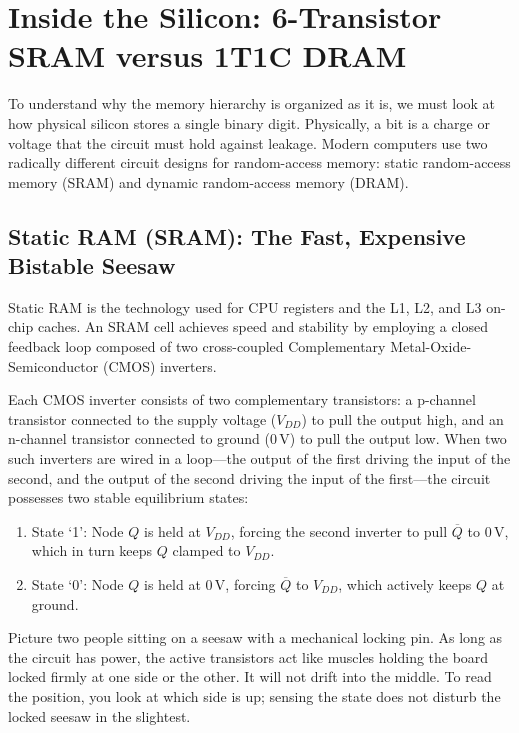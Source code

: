 \chapterline

\section{Inside the Silicon: 6-Transistor SRAM versus 1T1C DRAM}

To understand why the memory hierarchy is organized as it is, we must look at how
physical silicon stores a single binary digit. Physically, a bit is a charge or voltage
that the circuit must hold against leakage. Modern computers use two radically different circuit
designs for random-access memory: static random-access memory (SRAM) and dynamic random-access memory (DRAM).

\subsection{Static RAM (SRAM): The Fast, Expensive Bistable Seesaw}

Static RAM is the technology used for CPU registers and the L1, L2, and L3 on-chip
caches. An SRAM cell achieves speed and stability by employing a closed feedback loop
composed of two cross-coupled Complementary Metal-Oxide-Semiconductor (CMOS) inverters.

Each CMOS inverter consists of two complementary transistors: a p-channel transistor
connected to the supply voltage ($V_{DD}$) to pull the output high, and an n-channel
transistor connected to ground ($0\,\text{V}$) to pull the output low. When two such
inverters are wired in a loop---the output of the first driving the input of the second,
and the output of the second driving the input of the first---the circuit possesses two
stable equilibrium states:
\begin{enumerate}[itemsep=0pt]
    \item State `1': Node $Q$ is held at $V_{DD}$, forcing the second inverter to pull $\overline{Q}$ to $0\,\text{V}$, which in turn keeps $Q$ clamped to $V_{DD}$.
    \item State `0': Node $Q$ is held at $0\,\text{V}$, forcing $\overline{Q}$ to $V_{DD}$, which actively keeps $Q$ at ground.
\end{enumerate}

\begin{intuitionbox}
Picture two people sitting on a seesaw with a mechanical locking pin. As long as the
circuit has power, the active transistors act like muscles holding the board locked
firmly at one side or the other. It will not drift into the middle. To read the position,
you look at which side is up; sensing the state does not disturb the locked seesaw
in the slightest.
\end{intuitionbox}

